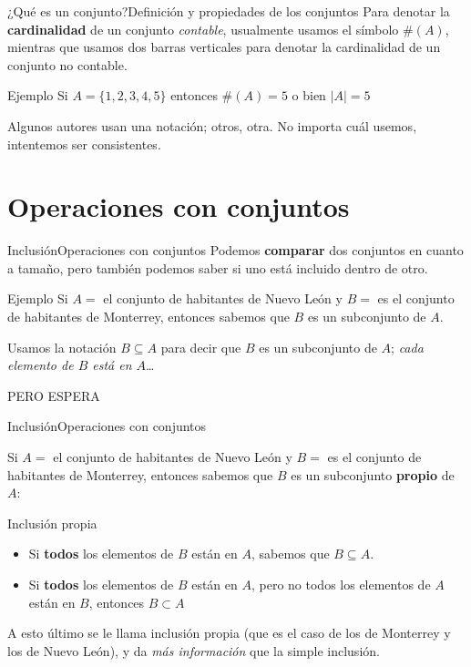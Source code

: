 \documentclass[spanish, c]{beamer}
\begin{document}
\begin{frame}{¿Qué es un conjunto?}{Definición y propiedades de los conjuntos}
    Para denotar la \textbf{cardinalidad} de un conjunto \textit{contable}, usualmente usamos el símbolo $\#(A)$, mientras que usamos dos barras verticales para denotar la cardinalidad de un conjunto no contable.

    \begin{exampleblock}{Ejemplo}
        Si $A = \{1, 2, 3, 4, 5\}$ entonces $\#(A)= 5$ o bien $\vert A \vert = 5$
    \end{exampleblock} \pause

    Algunos autores usan una notación; otros, otra. No importa cuál usemos, intentemos ser consistentes.
\end{frame}

\section{Operaciones con conjuntos}

\begin{frame}{Inclusión}{Operaciones con conjuntos}
    Podemos \textbf{comparar} dos conjuntos en cuanto a tamaño, pero también podemos saber si uno está \alert{incluido} dentro de otro. \pause

    \begin{exampleblock}{Ejemplo}
        Si $A = $ el conjunto de habitantes de Nuevo León y $B = $ es el conjunto de habitantes de Monterrey, entonces sabemos que $B$ es un \alert{subconjunto} de $A$.
    \end{exampleblock} \pause

    Usamos la notación $B \subseteq A$ para decir que $B$ es un \alert{subconjunto} de $A$; \textit{cada elemento de $B$ está en $A$}\dots \pause

    \bigskip

    {\Large PERO ESPERA}
\end{frame}

\begin{frame}{Inclusión}{Operaciones con conjuntos}

    Si $A = $ el conjunto de habitantes de Nuevo León y $B = $ es el conjunto de habitantes de Monterrey, entonces sabemos que $B$ es un \alert{subconjunto \textbf{propio}} de $A$: \pause

    \begin{block}{Inclusión propia}
        \begin{itemize}
            \item Si \textbf{todos} los elementos de $B$ están en $A$, sabemos que $B \subseteq A$.
            \item Si \textbf{todos} los elementos de $B$ están en $A$, pero no todos los elementos de $A$ están en $B$, entonces $B \subset A$
        \end{itemize}        
    \end{block}

    A esto último se le llama inclusión propia (que es el caso de los de Monterrey y los de Nuevo León), y da \textit{más información} que la simple inclusión.
\end{frame}
\end{document}
